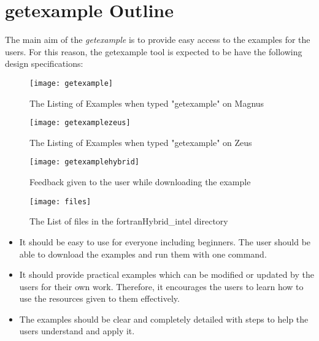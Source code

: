 
\section{getexample Outline}

The main aim of the \emph{getexample} is to provide easy access to the examples for the users. For this reason, the getexample tool is expected to be 
have the following design specifications:

\begin{figure}[!ht]
\begin{center}
\texttt{[image: getexample]}
\caption{The Listing of Examples when typed "getexample" on Magnus}
\end{center}
\end{figure}

\begin{figure}[!ht]
\begin{center}
\texttt{[image: getexamplezeus]}
\caption{The Listing of Examples when typed "getexample" on Zeus}
\end{center}
\end{figure}

\begin{figure}[!ht]
\begin{center}
\texttt{[image: getexamplehybrid]}
\caption{Feedback given to the user while downloading the example}
\end{center}
\end{figure}

\begin{figure}[!ht]
\begin{center}
\texttt{[image: files]}
\caption{The List of files in the fortranHybrid\_intel directory}
\end{center}
\end{figure}

\clearpage

\begin{itemize}
\item It should be easy to use for everyone including beginners. The user should be able to download the examples and run them with one command.
\item It should provide practical examples which can be modified or updated by the users for their own work. Therefore, it encourages the users to learn
how to use the resources given to them effectively.
\item The examples should be clear and completely detailed with steps to help the users understand and apply it.
\end{itemize}

